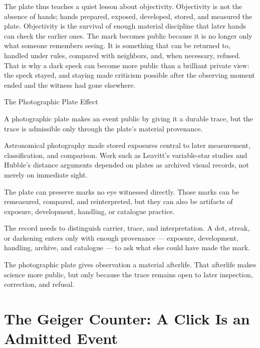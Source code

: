 The plate thus teaches a quiet lesson about objectivity. Objectivity is not the
absence of hands; hands prepared, exposed, developed, stored, and measured the
plate. Objectivity is the survival of enough material discipline that later
hands can check the earlier ones. The mark becomes public because it is no
longer only what someone remembers seeing. It is something that can be returned
to, handled under rules, compared with neighbors, and, when necessary, refused.
That is why a dark speck can become more public than a brilliant private view:
the speck stayed, and staying made criticism possible after the observing
moment ended and the witness had gone elsewhere.

\begin{phenom}{The Photographic Plate Effect~\cite{leavitt1912,hubble1929}}
\label{ph:photographic-plate}

\PhStatement
A photographic plate makes an event public by giving it a durable trace, but
the trace is admissible only through the plate's material provenance.

\PhOrigin
Astronomical photography made stored exposures central to later measurement,
classification, and comparison. Work such as Leavitt's variable-star studies
and Hubble's distance arguments depended on plates as archived visual records,
not merely on immediate sight.

\PhObservation
The plate can preserve marks no eye witnessed directly. Those marks can be
remeasured, compared, and reinterpreted, but they can also be artifacts of
exposure, development, handling, or catalogue practice.

\PhConstraint
The record needs to distinguish carrier, trace, and interpretation. A dot,
streak, or darkening enters only with enough provenance --- exposure,
development, handling, archive, and catalogue --- to ask what else could
have made the mark.

\PhConsequence
The photographic plate gives observation a material afterlife. That afterlife
makes science more public, but only because the trace remains open to later
inspection, correction, and refusal.
\end{phenom}

\section{The Geiger Counter: A Click Is an Admitted Event}

